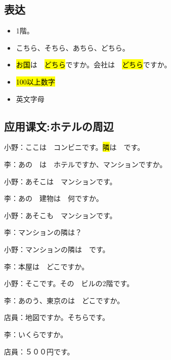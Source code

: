 \subsection{表达}

\begin{itemize}
    \item 1階。
    \item こちら、そちら、あちら、どちら。
    \item \hl{お国}は　\hl{どちら}ですか。会社は　\hl{どちら}ですか。
    \item \hl{100以上数字}
    \item 英文字母
\end{itemize}

\subsection{应用课文:ホテルの周辺}

小野：ここは　コンビニです。\hl{隣}は　です。

李：あの　は　ホテルですか、マンションですか。

小野：あそこは　マンションです。

李：あの　建物は　何ですか。

小野：あそこも　マンションです。

李：マンションの隣は？

小野：マンションの隣は　です。

\vspace{1em}

李：本屋は　どこですか。

小野：そこです。その　ビルの2階です。

\vspace{1em}

李：あのう、東京のは　どこですか。

店員：地図ですか。そちらです。

李：いくらですか。

店員：５００円です。


